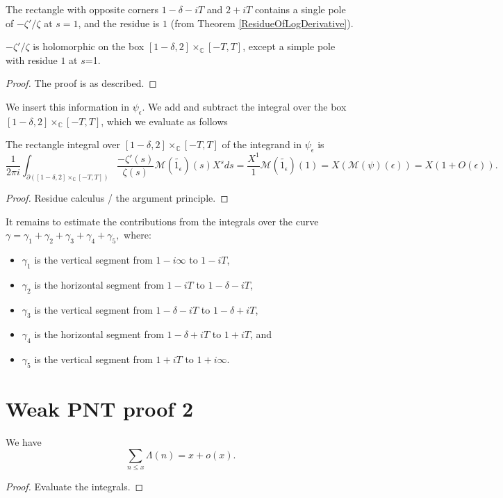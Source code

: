 The rectangle with opposite corners $1-\delta - i T$ and $2+iT$ contains a single pole of
$-\zeta'/\zeta$ at $s=1$, and the residue is $1$ (from Theorem \ref{ResidueOfLogDerivative}).
\begin{theorem}\label{ZeroFreeBox}
$-\zeta'/\zeta$ is holomorphic on the box $[1-\delta,2] \times_{ℂ} [-T,T]$, except a simple pole
with residue $1$ at $s$=1.
\end{theorem}


\begin{proof}
The proof is as described.
\end{proof}


We insert this information in $\psi_{\epsilon}$. We add and subtract the integral over the box
$[1-\delta,2] \times_{ℂ} [-T,T]$, which we evaluate as follows
\begin{theorem}\label{ZetaBoxEval}
The rectangle integral over $[1-\delta,2] \times_{ℂ} [-T,T]$ of the integrand in
$\psi_{\epsilon}$ is
$$\frac{1}{2\pi i}\int_{\partial([1-\delta,2] \times_{ℂ} [-T,T])}\frac{-\zeta'(s)}{\zeta(s)}
\mathcal{M}(\widetilde{1_{\epsilon}})(s)
X^{s}ds = \frac{X^{1}}{1}\mathcal{M}(\widetilde{1_{\epsilon}})(1)
= X\left(\mathcal{M}(\psi)\left(\epsilon\right)\right)
= X(1+O(\epsilon))
.$$
\end{theorem}


\begin{proof}
Residue calculus / the argument principle.
\end{proof}


It remains to estimate the contributions from the integrals over the curve $\gamma = \gamma_1 +
\gamma_2 + \gamma_3 + \gamma_4
+\gamma_5,
$
where:
\begin{itemize}
\item $\gamma_1$ is the vertical segment from $1-i\infty$ to $1-iT$,
\item $\gamma_2$ is the horizontal segment from $1-iT$ to $1-\delta-iT$,
\item $\gamma_3$ is the vertical segment from $1-\delta-iT$ to $1-\delta+iT$,
\item $\gamma_4$ is the horizontal segment from $1-\delta+iT$ to $1+iT$, and
\item $\gamma_5$ is the vertical segment from $1+iT$ to $1+i\infty$.
\end{itemize}



\section{Weak PNT proof 2}

\begin{theorem}\label{WeakPNT2}  We have
$$ \sum_{n \leq x} \Lambda(n) = x + o(x).$$
\end{theorem}


\begin{proof}
  Evaluate the integrals.
\end{proof}

